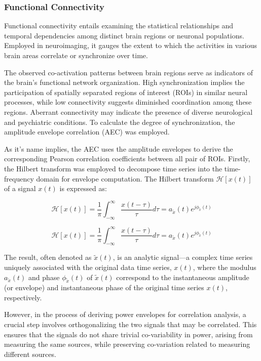 \documentclass{cys}
\begin{document}
\subsubsection{Functional Connectivity}

\smallskip
Functional connectivity entails examining the statistical relationships and temporal dependencies among distinct brain regions or neuronal populations. Employed in neuroimaging, it gauges the extent to which the activities in various brain areas correlate or synchronize over time.

\bigskip
The observed co-activation patterns between brain regions serve as indicators of the brain's functional network organization. High synchronization implies the participation of spatially separated regions of interest (ROIs) in similar neural processes, while low connectivity suggests diminished coordination among these regions. Aberrant connectivity may indicate the presence of diverse neurological and psychiatric conditions. To calculate the degree of synchronization, the amplitude envelope correlation (AEC) was employed.  



\bigskip
As it's name implies, the AEC uses the amplitude envelopes to derive the corresponding Pearson correlation coefficients between all pair of ROIs. Firstly, the Hilbert transform was employed to decompose time series into the time-frequency domain for envelope computation. The Hilbert transform $\mathcal{H}[x(t)]$ of a signal $x(t)$ is expressed as:

\begin{equation}
\mathcal{H}[x(t)]=\frac{1}{\pi}\int_{-\infty}^{\infty}\frac{x(t-\tau)}{\tau}d\tau=a_{\tilde{x}}(t)e^{j\phi_{\tilde{x}}(t)}
\end{equation}

\begin{equation}
\mathcal{H}[x(t)]=\frac{1}{\pi}\int_{-\infty}^{\infty}\frac{x(t-\tau)}{\tau}d\tau=a_{\tilde{x}}(t)e^{j\phi_{\tilde{x}}(t)} 
\end{equation}

The result, often denoted as $\tilde{x}(t)$, is an analytic signal—a complex time series uniquely associated with the original data time series, $x(t)$, where the modulus $a_{\tilde{x}}(t)$ and phase $\phi_{\tilde{x}}(t)$ of $\tilde{x}(t)$ correspond to the instantaneous amplitude (or envelope) and instantaneous phase of the original time series $x(t)$, respectively.

\bigskip
However, in the process of deriving power envelopes for correlation analysis, a crucial step involves orthogonalizing the two signals that may be correlated. This ensures that the signals do not share trivial co-variability in power, arising from measuring the same sources, while preserving co-variation related to measuring different sources.
\end{document}
